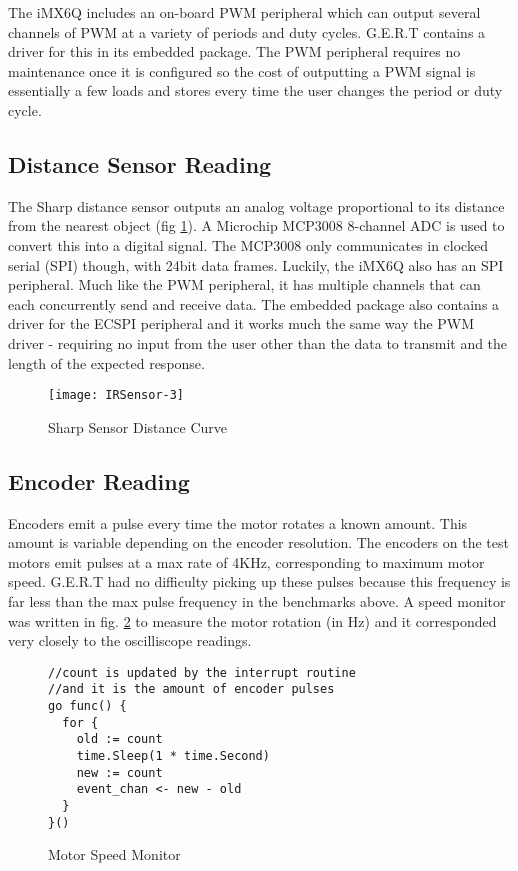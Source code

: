 The iMX6Q includes an on-board PWM peripheral which can output several channels of PWM
at a variety of periods and duty cycles. G.E.R.T contains a driver for this in its embedded
package. The PWM peripheral requires no maintenance once it is configured so the cost of outputting
a PWM signal is essentially a few loads and stores every time the user changes the period or duty cycle.

\subsection{Distance Sensor Reading}
The Sharp distance sensor outputs an analog voltage proportional to its distance from the nearest object (fig \ref{fig:curve}).
A Microchip MCP3008 8-channel ADC is used to convert this into a digital signal. The MCP3008 only communicates in clocked
serial (SPI) though, with 24bit data frames. Luckily, the iMX6Q also has an SPI peripheral. Much like the
PWM peripheral, it has multiple channels that can each concurrently send and receive data. The embedded
package also contains a driver for the ECSPI peripheral and it works much the same way the PWM driver - 
requiring no input from the user other than the data to transmit and the length of the expected response.

\begin{figure}[h]
\begin{center}
  \texttt{[image: IRSensor-3]}
\end{center}
  \caption{Sharp Sensor Distance Curve} \label{fig:curve}
\end{figure}

\clearpage
\subsection{Encoder Reading}
Encoders emit a pulse every time the motor rotates a known amount. This amount is variable depending on the
encoder resolution. The encoders on the test motors emit pulses at a max rate of 4KHz, corresponding to
maximum motor speed. G.E.R.T had no difficulty picking up these pulses because this frequency is far less than
the max pulse frequency in the benchmarks above. A speed monitor was written in fig. \ref{fig:speedmon}
to measure the motor rotation (in Hz) and it corresponded very closely to the oscilliscope readings.

\begin{figure}[h]
\begin{center}
\begin{lstlisting}
//count is updated by the interrupt routine
//and it is the amount of encoder pulses
go func() {
  for {
    old := count
    time.Sleep(1 * time.Second)
    new := count
    event_chan <- new - old
  }
}()
\end{lstlisting}
\end{center}
  \caption{Motor Speed Monitor} \label{fig:speedmon}
\end{figure}

